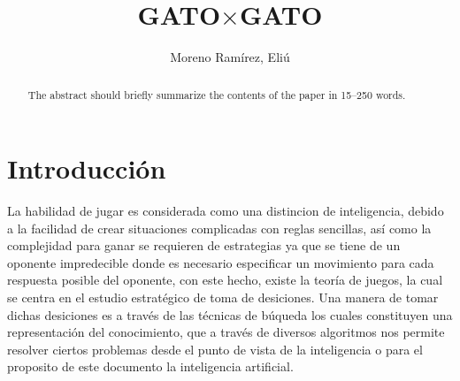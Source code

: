 \documentclass[runningheads]{llncs}
\begin{document}
%
\title{GATO$\times$GATO}
%
%
\author{Moreno Ramírez, Eliú}
%
%
%
\maketitle              %
%
\begin{abstract}
The abstract should briefly summarize the contents of the paper in
15--250 words.

\end{abstract}
%
%
%
\section{Introducción}
La habilidad de jugar es considerada como una distincion de inteligencia, debido a la facilidad de crear situaciones complicadas con reglas sencillas, así como la complejidad para ganar se requieren de estrategias ya que se tiene de un oponente impredecible donde es necesario especificar un movimiento para cada respuesta posible del oponente, con este hecho, existe la teoría de juegos, la cual se centra en el estudio estratégico de toma de desiciones. Una manera de tomar dichas desiciones es a través de las técnicas de búqueda los cuales constituyen una representación del conocimiento, que a través de diversos algoritmos nos permite resolver ciertos problemas desde el punto de vista de la inteligencia o para el proposito de este documento la inteligencia artificial. 
\end{document}
